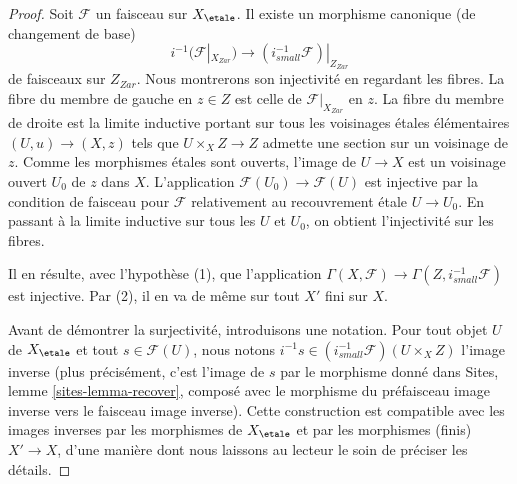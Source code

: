 \begin{proof}
Soit $\mathcal{F}$ un faisceau sur $X_\etale$. Il existe un morphisme canonique
(de changement de base)
$$
i^{-1}(\mathcal{F}|_{X_{Zar}})
\longrightarrow
(i_{small}^{-1}\mathcal{F})|_{Z_{Zar}}
$$
de faisceaux sur $Z_{Zar}$. Nous montrerons son injectivité en regardant
les fibres. La fibre du membre de gauche en $z \in Z$
est celle de $\mathcal{F}|_{X_{Zar}}$ en $z$. La fibre du membre de droite
est la limite inductive portant sur tous les voisinages étales élémentaires
$(U, u) \to (X, z)$ tels que $U \times_X Z \to Z$ admette une section sur
un voisinage de $z$. Comme les morphismes étales sont ouverts, l'image de
$U \to X$ est un voisinage ouvert $U_0$ de $z$ dans $X$. L'application
$\mathcal{F}(U_0) \to \mathcal{F}(U)$ est injective par la condition de faisceau
pour $\mathcal{F}$ relativement au recouvrement étale $U \to U_0$.
En passant à la limite inductive sur tous les $U$ et $U_0$, on obtient l'injectivité sur les fibres.

\medskip\noindent
Il en résulte, avec l'hypothèse (1), que l'application
$\Gamma(X, \mathcal{F}) \to \Gamma(Z, i^{-1}_{small}\mathcal{F})$
est injective. Par (2), il en va de même sur tout $X'$ fini sur $X$.

\medskip\noindent
Avant de démontrer la surjectivité, introduisons une notation. Pour
tout objet $U$ de $X_\etale$ et tout $s \in \mathcal{F}(U)$, nous
notons $i^{-1}s \in (i_{small}^{-1}\mathcal{F})(U \times_X Z)$
l'image inverse (plus précisément, c'est l'image de $s$ par le morphisme
donné dans Sites, lemme \ref{sites-lemma-recover}, composé avec le morphisme du
préfaisceau image inverse vers le faisceau image inverse). Cette construction est
compatible avec les images inverses par les morphismes de $X_\etale$ et par les morphismes (finis)
$X' \to X$, d'une manière dont nous laissons au lecteur le soin de préciser les détails.


\end{proof}
